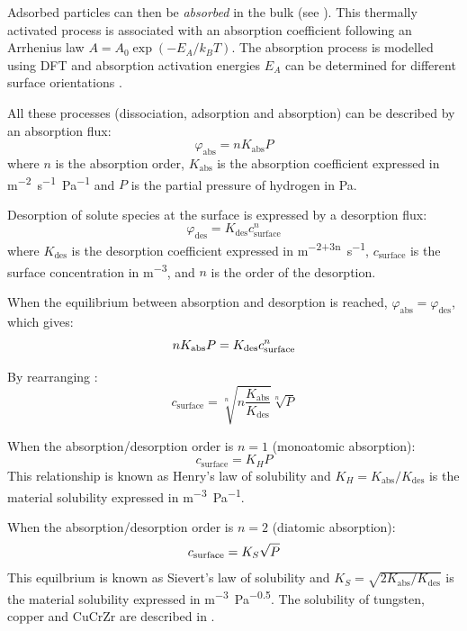 Adsorbed particles can then be \textit{absorbed} in the bulk (see ).
This thermally activated process is associated with an absorption coefficient following an Arrhenius law $A=A_0 \exp{(-E_A/k_B T)}$.
The absorption process is modelled using DFT and absorption activation energies $E_A$ can be determined for different surface orientations .

All these processes (dissociation, adsorption and absorption) can be described by an absorption flux:
\begin{equation}
    \varphi_\mathrm{abs} = n K_\mathrm{abs} P
\end{equation}
where $n$ is the absorption order, $K_\mathrm{abs}$ is the absorption coefficient expressed in \si{m^{-2}.s^{-1}.Pa^{-1}} and $P$ is the partial pressure of hydrogen in \si{Pa}.

Desorption of solute species at the surface is expressed by a desorption flux:
\begin{equation}
    \varphi_\mathrm{des} = K_\mathrm{des} c_\mathrm{surface}^n
\end{equation}
where $K_\mathrm{des}$ is the desorption coefficient expressed in \si{m^{-2+3n}.s^{-1}}, $c_\mathrm{surface}$ is the surface concentration in \si{m^{-3}}, and $n$ is the order of the desorption.

When the equilibrium between absorption and desorption is reached, $\varphi_\mathrm{abs} = \varphi_\mathrm{des}$, which gives:
\begin{equation}
    n K_\mathrm{abs} P = K_\mathrm{des} c_\mathrm{surface}^n
    \labeq{equilibrium absorption desorption}
\end{equation}

By rearranging :
\begin{equation}
    c_\mathrm{surface} = \sqrt[n]{n \frac{K_\mathrm{abs}}{K_\mathrm{des}}} \sqrt[n]{P}
\end{equation}

When the absorption/desorption order is $n=1$ (monoatomic absorption):
\begin{equation}
    c_\mathrm{surface} = K_H P
\end{equation}
This relationship is known as Henry's law of solubility and $K_H = K_\mathrm{abs}/K_\mathrm{des}$ is the material solubility expressed in \si{m^{-3}.Pa^{-1}}.

When the absorption/desorption order is $n=2$ (diatomic absorption):
\begin{equation}
    c_\mathrm{surface} = K_S \sqrt{P}
    \labeq{sievert's law}
\end{equation}
This equilbrium is known as Sievert's law of solubility and $K_S = \sqrt{2 K_\mathrm{abs}/K_\mathrm{des}}$ is the material solubility expressed in \si{m^{-3}.Pa^{-0.5}}.
The solubility of tungsten, copper and CuCrZr are described in .


